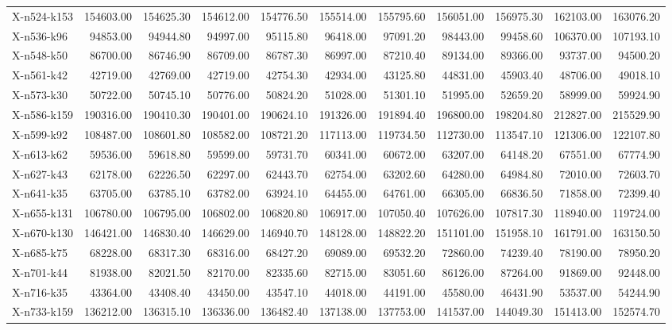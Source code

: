 \documentclass[letterpaper]{article} %
\begin{document}
\begin{landscape}
\begin{longtable}{@{}l rr rr rr rr rr@{}}
X-n524-k153 & 154603.00 & 154625.30 & 154612.00 & 154776.50 & 155514.00 & 155795.60 & 156051.00 & 156975.30 & 162103.00 & 163076.20 \\
X-n536-k96 & 94853.00 & 94944.80 & 94997.00 & 95115.80 & 96418.00 & 97091.20 & 98443.00 & 99458.60 & 106370.00 & 107193.10 \\
X-n548-k50 & 86700.00 & 86746.90 & 86709.00 & 86787.30 & 86997.00 & 87210.40 & 89134.00 & 89366.00 & 93737.00 & 94500.20 \\
X-n561-k42 & 42719.00 & 42769.00 & 42719.00 & 42754.30 & 42934.00 & 43125.80 & 44831.00 & 45903.40 & 48706.00 & 49018.10 \\
X-n573-k30 & 50722.00 & 50745.10 & 50776.00 & 50824.20 & 51028.00 & 51301.10 & 51995.00 & 52659.20 & 58999.00 & 59924.90 \\
X-n586-k159 & 190316.00 & 190410.30 & 190401.00 & 190624.10 & 191326.00 & 191894.40 & 196800.00 & 198204.80 & 212827.00 & 215529.90 \\
X-n599-k92 & 108487.00 & 108601.80 & 108582.00 & 108721.20 & 117113.00 & 119734.50 & 112730.00 & 113547.10 & 121306.00 & 122107.80 \\
X-n613-k62 & 59536.00 & 59618.80 & 59599.00 & 59731.70 & 60341.00 & 60672.00 & 63207.00 & 64148.20 & 67551.00 & 67774.90 \\
X-n627-k43 & 62178.00 & 62226.50 & 62297.00 & 62443.70 & 62754.00 & 63202.60 & 64280.00 & 64984.80 & 72010.00 & 72603.70 \\
X-n641-k35 & 63705.00 & 63785.10 & 63782.00 & 63924.10 & 64455.00 & 64761.00 & 66305.00 & 66836.50 & 71858.00 & 72399.40 \\
X-n655-k131 & 106780.00 & 106795.00 & 106802.00 & 106820.80 & 106917.00 & 107050.40 & 107626.00 & 107817.30 & 118940.00 & 119724.00 \\
X-n670-k130 & 146421.00 & 146830.40 & 146629.00 & 146940.70 & 148128.00 & 148822.20 & 151101.00 & 151958.10 & 161791.00 & 163150.50 \\
X-n685-k75 & 68228.00 & 68317.30 & 68316.00 & 68427.20 & 69089.00 & 69532.20 & 72860.00 & 74239.40 & 78190.00 & 78950.20 \\
X-n701-k44 & 81938.00 & 82021.50 & 82170.00 & 82335.60 & 82715.00 & 83051.60 & 86126.00 & 87264.00 & 91869.00 & 92448.00 \\
X-n716-k35 & 43364.00 & 43408.40 & 43450.00 & 43547.10 & 44018.00 & 44191.00 & 45580.00 & 46431.90 & 53537.00 & 54244.90 \\
X-n733-k159 & 136212.00 & 136315.10 & 136336.00 & 136482.40 & 137138.00 & 137753.00 & 141537.00 & 144049.30 & 151413.00 & 152574.70 \\

\end{longtable}
\end{landscape}
\end{document}
